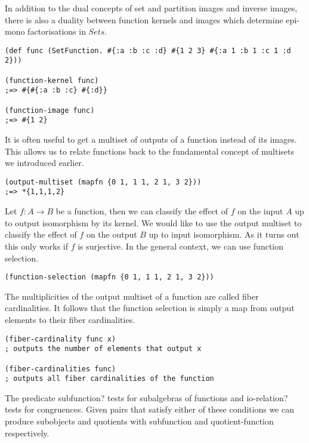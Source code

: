 \documentclass[a4paper,11pt]{report}
\begin{document}
In addition to the dual concepts of set and partition images and inverse images, there is also a duality between function kernels and images which determine epi-mono factorisations in $Sets$.

\lstset {language=Lisp}
\begin{lstlisting}
(def func (SetFunction. #{:a :b :c :d} #{1 2 3} #{:a 1 :b 1 :c 1 :d 2}))

(function-kernel func)
;=> #{#{:a :b :c} #{:d}}

(function-image func)
;=> #{1 2}
\end{lstlisting}

\newpage 

It is often useful to get a multiset of outputs of a function instead of its images. This allows us to relate functions back to the fundamental concept of multisets we introduced earlier.

\lstset {language=Lisp}
\begin{lstlisting}
(output-multiset (mapfn {0 1, 1 1, 2 1, 3 2}))
;=> *{1,1,1,2}
\end{lstlisting}

Let $f: A \to B$ be a function, then we can classify the effect of $f$ on the input $A$ up to output isomorphism by its kernel.  We would like to use the output multiset to classify the effect of $f$ on the output $B$ up to input isomorphism. As it turns out this only works if $f$ is surjective. In the general context, we can use function selection.

\lstset {language=Lisp}
\begin{lstlisting}
(function-selection (mapfn {0 1, 1 1, 2 1, 3 2}))
\end{lstlisting}

The multiplicities of the output multiset of a function are called fiber cardinalities. It follows that the function selection is simply a map from output elements to their fiber cardinalities.

\lstset {language=Lisp}
\begin{lstlisting}
(fiber-cardinality func x)
; outputs the number of elements that output x

(fiber-cardinalities func)
; outputs all fiber cardinalities of the function
\end{lstlisting}

The predicate subfunction? tests for subalgebras of functions and io-relation? tests for congruences. Given pairs that satisfy either of these conditions we can produce subobjects and quotients with subfunction and quotient-function respectively.
\end{document}
